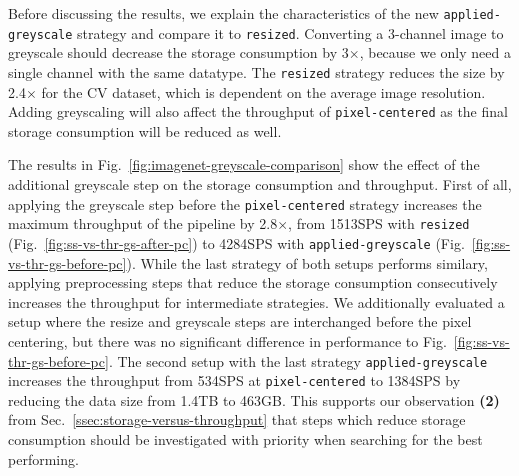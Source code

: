 {\color{diff3}

Before discussing the results, we explain the characteristics of the new \texttt{applied-greyscale} strategy and compare it to \texttt{resized}.
Converting a 3-channel image to greyscale should decrease the storage consumption by 3$\times$, because we only need a single channel with the same datatype.
The \texttt{resized} strategy reduces the size by 2.4$\times$ for the CV dataset, which is dependent on the average image resolution.
Adding greyscaling will also affect the throughput of \texttt{pixel-centered} as the final storage consumption will be reduced as well.

The results in Fig.~\ref{fig:imagenet-greyscale-comparison} show the effect of the additional greyscale step on the storage consumption and throughput. 
First of all, applying the greyscale step before the \texttt{pixel-centered} strategy increases the maximum throughput of the pipeline by 2.8$\times$, from 1513\:SPS with \texttt{resized} (Fig.~\ref{fig:ss-vs-thr-gs-after-pc}) to 4284\:SPS with \texttt{applied-greyscale} (Fig.~\ref{fig:ss-vs-thr-gs-before-pc}).
While the last strategy of both setups performs similary, applying preprocessing steps that reduce the storage consumption consecutively increases the throughput for intermediate strategies.
We additionally evaluated a setup where the resize and greyscale steps are interchanged before the pixel centering, but there was no significant difference in performance to Fig.~\ref{fig:ss-vs-thr-gs-before-pc}.
The second setup with the last strategy \texttt{applied-greyscale} increases the throughput from 534\:SPS at \texttt{pixel-centered} to 1384\:SPS by reducing the data size from 1.4\:TB to 463\:GB.
This supports our observation \textbf{(2)} from Sec.~\ref{ssec:storage-versus-throughput} that steps which reduce storage consumption should be investigated with priority when searching for the best performing.

}





